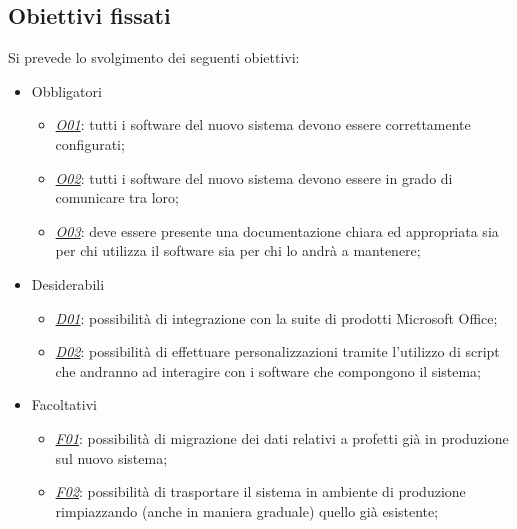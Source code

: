 \subsection*{Obiettivi fissati}
Si prevede lo svolgimento dei seguenti obiettivi:
\begin{itemize}
	\item Obbligatori
	\begin{itemize}
		\item \underline{\textit{O01}}: tutti i software del nuovo sistema devono essere correttamente configurati;
		\item \underline{\textit{O02}}: tutti i software del nuovo sistema devono essere in grado di comunicare tra loro;
		\item \underline{\textit{O03}}: deve essere presente una documentazione chiara ed appropriata sia per chi utilizza il software sia per chi lo andrà a mantenere;
	\end{itemize}
	
	\item Desiderabili 
	\begin{itemize}
		\item \underline{\textit{D01}}: possibilità di integrazione con la suite di prodotti Microsoft Office;
		\item \underline{\textit{D02}}: possibilità di effettuare personalizzazioni tramite l'utilizzo di script che andranno ad interagire con i software che compongono il sistema;
	\end{itemize}
	
	\item Facoltativi
	\begin{itemize}
		\item \underline{\textit{F01}}: possibilità di migrazione dei dati relativi a profetti già in produzione sul nuovo sistema;
		\item \underline{\textit{F02}}: possibilità di trasportare il sistema in ambiente di produzione rimpiazzando (anche in maniera graduale) quello già esistente;
	\end{itemize} 
\end{itemize}

